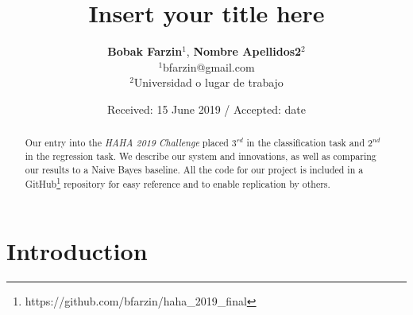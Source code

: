 \documentclass[smallextended]{svjour3}       %
\begin{document}
\title{Insert your title here%
}


\author {\textbf{Bobak Farzin$^1$}, \textbf{Nombre Apellidos2$^2$}\\
	$^1$bfarzin@gmail.com\\
	$^2$Universidad o lugar de trabajo\\
}


\institute{}

\date{Received: 15 June 2019 / Accepted: date}


\maketitle

\begin{abstract}
Our entry into the \textit{HAHA 2019 Challenge} placed $3^{rd}$ in the classification task and $2^{nd}$ in the regression task.  We describe our system and innovations, as well as comparing our results to a Naive Bayes baseline. All the code for our project is included in a GitHub\footnote{https://github.com/bfarzin/haha\_2019\_final} repository for easy reference and to enable replication by others.

\end{abstract}

\section{Introduction}
\label{intro}
\newcommand{\chapquote}[3]{\begin{quotation} \textit{#1} \end{quotation} \begin{flushright} - #2, \textit{#3}\end{flushright} }
\end{document}
